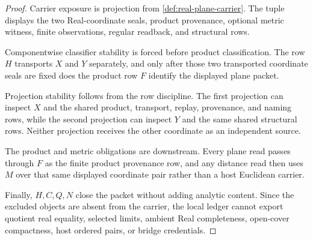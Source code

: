 \begin{proof}
Carrier exposure is projection from \autoref{def:real-plane-carrier}. The tuple displays the two Real-coordinate seals, product provenance, optional metric witness, finite observations, regular readback, and structural rows.

Componentwise classifier stability is forced before product classification. The row $H$ transports $X$ and $Y$ separately, and only after those two transported coordinate seals are fixed does the product row $F$ identify the displayed plane packet.

Projection stability follows from the row discipline. The first projection can inspect $X$ and the shared product, transport, replay, provenance, and naming rows, while the second projection can inspect $Y$ and the same shared structural rows. Neither projection receives the other coordinate as an independent source.

The product and metric obligations are downstream. Every plane read passes through $F$ as the finite product provenance row, and any distance read then uses $M$ over that same displayed coordinate pair rather than a host Euclidean carrier.

Finally, $H,C,Q,N$ close the packet without adding analytic content. Since the excluded objects are absent from the carrier, the local ledger cannot export quotient real equality, selected limits, ambient Real completeness, open-cover compactness, host ordered pairs, or bridge credentials.
\end{proof}


